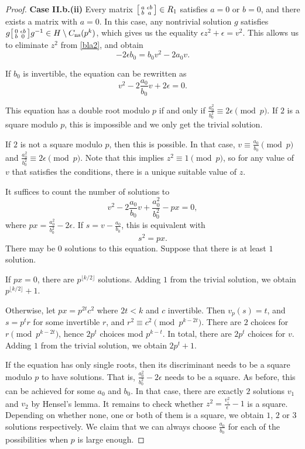 \documentclass[10pt,a4paper]{amsart}
\newcommand\sm[1]{\begin{bsmallmatrix}#1\end{bsmallmatrix}}
\begin{document}
\begin{proof}
\noindent \textbf{Case II.b.(ii)} Every matrix $\sm{a & \epsilon b \\ b & a}\in R_1$ satisfies $a=0$ or $b=0$, and there exists a matrix with $a=0$. In this case, any nontrivial solution $g$ satisfies $g \sm{0 & \epsilon b \\ b & 0}g^{-1}\in H\setminus C_{\mathrm{ns}}(p^k)$, which gives us the equality
$\epsilon z^2+\epsilon =v^2$. This allows us to eliminate $z^2$ from \eqref{bla2}, and obtain $$-2\epsilon b_0=b_0 v^2-2a_0v.$$

If $b_0$ is invertible, the equation can be rewritten as $$v^2-2\frac{a_0}{b_0}v+2\epsilon=0.$$

This equation has a double root modulo $p$ if and only if $\frac{a_0^2}{b_0^2}\equiv 2\epsilon \pmod p$. If $2$ is a square modulo $p$, this is impossible and we only get the trivial solution. 

If $2$ is not a square modulo $p$, then this is possible. In that case, $v\equiv \frac{a_0}{b_0} \pmod p$ and $\frac{a_0^2}{b_0^2}\equiv 2\epsilon \pmod p$. Note that this implies $z^2\equiv 1 \pmod p$, so for any value of $v$ that satisfies the conditions, there is a unique suitable value of $z$.

It suffices to count the number of solutions to $$v^2-2\frac{a_0}{b_0}v+\frac{a_0^2}{b_0^2}-px=0,$$ where $p x=\frac{a_0^2}{b_0^2}-2\epsilon$. If $s=v-\frac{a_0}{b_0}$, this is equivalent with $$s^2=px.$$
There may be $0$ solutions to this equation. Suppose that there is at least $1$ solution. 

If $px=0$, there are $p^{\lfloor k/2 \rfloor}$ solutions. Adding $1$ from the trivial solution, we obtain $p^{\lfloor k/2 \rfloor}+1$. 

Otherwise, let $px=p^{2t}c^2$ where $2t<k$ and $c$ invertible. Then $v_p(s)=t$, and $s=p^t r$ for some invertible $r$, and $r^2\equiv c^2 \pmod p^{k-2t}$. There are $2$ choices for $r \pmod {p^{k-2t}}$, hence $2p^{t}$ choices mod $p^{k-t}$. In total, there are $2p^{t}$ choices for $v$. Adding $1$ from the trivial solution, we obtain $2p^t+1$.

If the equation has only single roots, then its discriminant needs to be a square modulo $p$ to have solutions. That is, $\frac{a_0^2}{b_0^2}-2\epsilon$ needs to be a square. As before, this can be achieved for some $a_0$ and $b_0$.  In that case, there are exactly $2$ solutions $v_1$ and $v_2$ by Hensel's lemma. It remains to check whether $z^2=\frac{v_i^2}{\epsilon}-1$ is a square. Depending on whether none, one or both of them is a square, we obtain $1$, $2$ or $3$ solutions respectively. We claim that we can always choose $\frac{a_0}{b_0}$ for each of the possibilities when $p$ is large enough. 


\end{proof}
\end{document}
